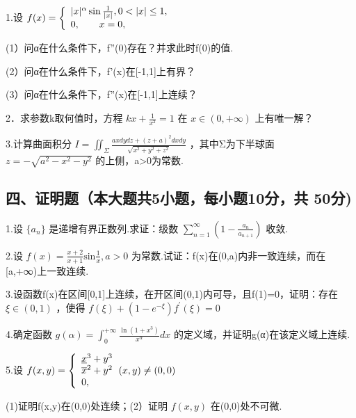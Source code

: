 \documentclass[11pt,fontset=fandol]{ctexart}
\begin{document}
1.设
\(f ( x ) = { \left\{ \begin{array} { l l } { | x | ^ { \alpha } \sin { \frac { 1 } { | x | } } , 0 < | x | \leq 1 , } \\ { 0 , \qquad x = 0 , } \end{array} \right. }\)

(1）问α在什么条件下，f''(0)存在？并求此时f(0)的值.

(2）问α在什么条件下，f'(x)在{[}-1,1{]}上有界？

(3）问α在什么条件下，f''(x)在{[}-1,1{]}上连续？

2．求参数k取何值时，方程 \(k x + \frac { 1 } { x ^ { 2 } } = 1\) 在
\(x \in ( 0 , + \infty )\) 上有唯一解？

3.计算曲面积分
\(I = \iint _ { \Sigma } \frac { a x d y d z + ( z + a ) ^ { 2 } d x d y } { \sqrt { x ^ { 2 } + y ^ { 2 } + z ^ { 2 } } }\)
，其中Σ为下半球面\(z = - \sqrt { a ^ { 2 } - x ^ { 2 } - y ^ { 2 } }\)
的上侧，a\textgreater0为常数.

\subsection{四、证明题（本大题共5小题，每小题10分，共
50分)}\label{ux56dbux8bc1ux660eux9898ux672cux5927ux9898ux51715ux5c0fux9898ux6bcfux5c0fux989810ux5206ux5171-50ux5206}

1.设 \(\{ a _ { n } \}\) 是递增有界正数列.求证：级数
\(\sum _ { n = 1 } ^ { \infty } \left( 1 - { \frac { a _ { n } } { a _ { n + 1 } } } \right)\)
收敛.

2.设
\(f ( x ) = { \frac { x + 2 } { x + 1 } } \mathrm { s i n } { \frac { 1 } { x } } , a > 0\)
为常数.试证：f(x)在(0,a)内非一致连续，而在 {[}a,+∞)上一致连续.

3.设函数f(x)在区间{[}0,1{]}上连续，在开区间(0,1)内可导，且f(1)=0，证明：存在
\(\xi \in ( 0 , 1 )\) ，使得
\(f ( \xi ) + ( 1 - e ^ { - \xi } ) f ^ { \prime } ( \xi ) = 0\)

4.确定函数
\(g ( \alpha ) = \int _ { 0 } ^ { + \infty } { \frac { \ln ( 1 + x ^ { 3 } ) } { x ^ { \alpha } } } d x\)
的定义域，并证明g(α)在该定义域上连续.

5.设
\(f ( x , y ) = { \left\{ \begin{array} { l l } { { \underline { { x } } } ^ { 3 } + y ^ { 3 } } \\ { { \overline { { x } } } ^ { 2 } + y ^ { 2 } } \\ { 0 , } \end{array} \right. } ( x , y ) \neq ( 0 , 0 )\)

(1)证明f(x,y)在(0,0)处连续；(2）证明 \(f ( x , y )\) 在(0,0)处不可微.
\end{document}

